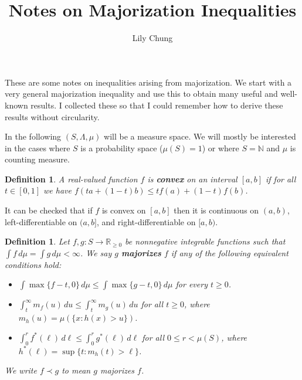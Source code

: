 \documentclass{article}
\title{Notes on Majorization Inequalities}
\author{Lily Chung}
\date{}
\newtheorem{definition}[theorem]{Definition}
\newcommand*{\defn}[1]{\textbf{#1}}
\newcommand*{\N}[0]{\mathbb{N}}
\newcommand*{\R}[0]{\mathbb{R}}
\def\[#1\]{\begin{align*}#1\end{align*}}
\begin{document}
\maketitle

These are some notes on inequalities arising from majorization.
We start with a very general majorization inequality and use this to obtain many useful and well-known results.
I collected these so that I could remember how to derive these results without circularity.

In the following $(S, \Lambda, \mu)$ will be a measure space.
We will mostly be interested in the cases where $S$ is a probability space ($\mu(S) = 1$) or where $S = \N$ and $\mu$ is counting measure.

\begin{definition}
  A real-valued function $f$ is \defn{convex} on an interval $[a, b]$ if for all $t \in [0, 1]$ we have $f(ta + (1 - t)b) \le tf(a) + (1 - t)f(b)$.
\end{definition}

It can be checked that if $f$ is convex on $[a, b]$ then it is continuous on $(a, b)$, left-differentiable on $(a, b]$, and right-differentiable on $[a, b)$.




\begin{definition}
  Let $f, g : S \to \R_{\ge 0}$ be nonnegative integrable functions such that $\int f\,d\mu = \int g\,d\mu < \infty$.
  We say $g$ \defn{majorizes} $f$ if any of the following equivalent conditions hold:
  \begin{itemize}
  \item $\int \max\{f - t, 0\}\,d\mu \le \int \max\{g - t, 0\}\,d\mu$ for every $t \ge 0$.
  \item $\int_t^\infty m_f(u)\,du \le \int_t^\infty m_g(u)\,du$ for all $t \ge 0$, where $m_h(u) = \mu(\{x : h(x) > u\})$.
  \item $\int_0^r f^*(\ell)\,d\ell \le \int_0^r g^*(\ell)\,d\ell$ for all $0 \le r < \mu(S)$, where $h^*(\ell) = \sup\{t : m_h(t) > \ell\}$.
  \end{itemize}
  We write $f \prec g$ to mean $g$ majorizes $f$.
\end{definition}
\end{document}
